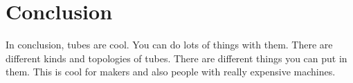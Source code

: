 \section{Conclusion}
In conclusion, tubes are cool.  You can do lots of things with them.  There are different kinds and topologies of tubes.  There are different things you can put in them.  This is cool for makers and also people with really expensive machines.